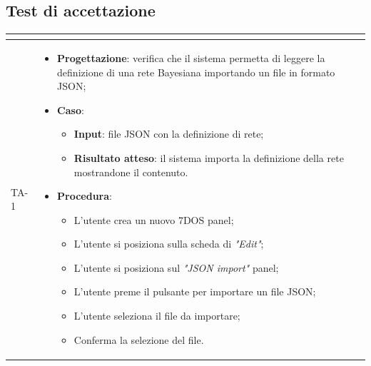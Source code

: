 \subsection{Test di accettazione}
\normalsize
\renewcommand{\arraystretch}{1}
\begin{longtable}{|C{2.5cm}|C{13cm}|}
	\hline
	\textbf{\color{title_text}{Test}} & \textbf{\color{title_text}{Specifica}}  \\
	\hline
	\endhead
{TA-1} &
\begin{itemize}
	\item \textbf{Progettazione}: verifica che il sistema permetta di leggere la definizione di una rete Bayesiana importando un file in formato JSON;
	\item \textbf{Caso}: 
		\begin{itemize}
			\item \textbf{Input}: file JSON con la definizione di rete;
			\item \textbf{Risultato atteso}: il sistema importa la definizione della rete mostrandone il contenuto.
		\end{itemize}
	\item \textbf{Procedura}:
		\begin{itemize}
			\item L'utente crea un nuovo 7DOS panel;
			\item L'utente si posiziona sulla scheda di \emph{"Edit"};
			\item L'utente si posiziona sul \emph{"JSON import"} panel;
			\item L'utente preme il pulsante per importare un file JSON;
			\item L'utente seleziona il file da importare;
			\item Conferma la selezione del file.
		\end{itemize} 
\end{itemize} \\
\hline


\end{longtable}
